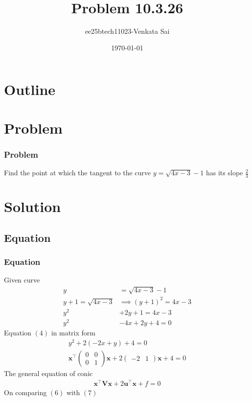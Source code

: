 \documentclass{beamer}
\title{Problem 10.3.26}
\author{ee25btech11023-Venkata Sai}
\date{\today}
\providecommand{\brak}[1]{\ensuremath{\left(#1\right)}}
\theoremstyle{remark}
\newcommand{\myvec}[1]{\ensuremath{\begin{pmatrix}#1\end{pmatrix}}}
\let\vec\mathbf
\numberwithin{equation}{section}
\begin{document}
\begin{frame}
\titlepage
\end{frame}

\section*{Outline}
\begin{frame}
\tableofcontents
\end{frame}

\section{Problem}

\begin{frame}
\frametitle{Problem}
Find the point at which the tangent to the curve $y = \sqrt{4x-3}-1$ has its slope $\frac{2}{3}$ 
\end{frame}
\section{Solution}

 
\subsection{Equation}
\begin{frame}
\frametitle{Equation}
Given curve
\begin{align}
y &= \sqrt{4x-3}-1 \\
y+1=\sqrt{4x-3} &\implies \brak{y+1}^2 =4x-3 \\
y^2&+2y+1=4x-3 \\
y^2&-4x+2y+4=0
\end{align}
Equation \brak{4} in matrix form
\begin{align}
y^2+2\brak{-2x+y}+4=0 \\
\vec{x}^\top\myvec{0&0\\0&1}\vec{x}+2\myvec{-2&1}\vec{x}+4=0
\end{align}
The general equation of conic
\begin{align}
    \vec{x}^\top\vec{V}\vec{x} + 2\vec{u}^\top\vec{x} + f = 0
\end{align}
On comparing \brak{6} with \brak{7}

\end{frame}
\end{document}
